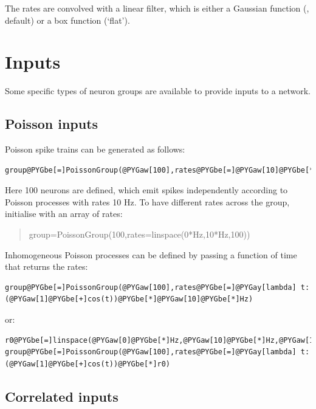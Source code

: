 \documentclass[letterpaper,10pt,english]{manual}
\begin{document}
The rates are convolved with a linear filter, which is either a Gaussian function
(, default) or a box function (`flat').

\resetcurrentobjects


\section{Inputs}

Some specific types of neuron groups are available to provide inputs to a network.


\subsection{Poisson inputs}

Poisson spike trains can be generated as follows:

\begin{Verbatim}[commandchars=@\[\]]
group@PYGbe[=]PoissonGroup(@PYGaw[100],rates@PYGbe[=]@PYGaw[10]@PYGbe[*]Hz)
\end{Verbatim}

Here 100 neurons are defined, which emit spikes independently according to Poisson
processes with rates 10 Hz. To have different rates across the group,
initialise with an array of rates:
\begin{quote}

group=PoissonGroup(100,rates=linspace(0*Hz,10*Hz,100))
\end{quote}

Inhomogeneous Poisson processes can be defined by passing a function of time that returns the
rates:

\begin{Verbatim}[commandchars=@\[\]]
group@PYGbe[=]PoissonGroup(@PYGaw[100],rates@PYGbe[=]@PYGay[lambda] t:(@PYGaw[1]@PYGbe[+]cos(t))@PYGbe[*]@PYGaw[10]@PYGbe[*]Hz)
\end{Verbatim}

or:

\begin{Verbatim}[commandchars=@\[\]]
r0@PYGbe[=]linspace(@PYGaw[0]@PYGbe[*]Hz,@PYGaw[10]@PYGbe[*]Hz,@PYGaw[100])
group@PYGbe[=]PoissonGroup(@PYGaw[100],rates@PYGbe[=]@PYGay[lambda] t:(@PYGaw[1]@PYGbe[+]cos(t))@PYGbe[*]r0)
\end{Verbatim}


\subsection{Correlated inputs}
\end{document}

